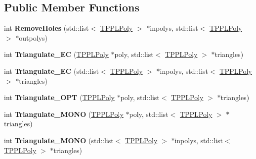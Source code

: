 \subsection*{Public Member Functions}
\begin{DoxyCompactItemize}
\item 
\mbox{\label{class_t_p_p_l_partition_ae2a167f8aa0f74725ffb389a612b0b70}} 
int {\bfseries Remove\+Holes} (std\+::list$<$ \mbox{\hyperlink{class_t_p_p_l_poly}{T\+P\+P\+L\+Poly}} $>$ $\ast$inpolys, std\+::list$<$ \mbox{\hyperlink{class_t_p_p_l_poly}{T\+P\+P\+L\+Poly}} $>$ $\ast$outpolys)
\item 
\mbox{\label{class_t_p_p_l_partition_abdd4502a0f66347ff44f4ee18d4668aa}} 
int {\bfseries Triangulate\+\_\+\+EC} (\mbox{\hyperlink{class_t_p_p_l_poly}{T\+P\+P\+L\+Poly}} $\ast$poly, std\+::list$<$ \mbox{\hyperlink{class_t_p_p_l_poly}{T\+P\+P\+L\+Poly}} $>$ $\ast$triangles)
\item 
\mbox{\label{class_t_p_p_l_partition_a5d91a5b4d233cb15b2745622a944cd04}} 
int {\bfseries Triangulate\+\_\+\+EC} (std\+::list$<$ \mbox{\hyperlink{class_t_p_p_l_poly}{T\+P\+P\+L\+Poly}} $>$ $\ast$inpolys, std\+::list$<$ \mbox{\hyperlink{class_t_p_p_l_poly}{T\+P\+P\+L\+Poly}} $>$ $\ast$triangles)
\item 
\mbox{\label{class_t_p_p_l_partition_a658327414e13faace5a882858d2ddbcb}} 
int {\bfseries Triangulate\+\_\+\+O\+PT} (\mbox{\hyperlink{class_t_p_p_l_poly}{T\+P\+P\+L\+Poly}} $\ast$poly, std\+::list$<$ \mbox{\hyperlink{class_t_p_p_l_poly}{T\+P\+P\+L\+Poly}} $>$ $\ast$triangles)
\item 
\mbox{\label{class_t_p_p_l_partition_aa0876517c10f9cb9bbb63ed570ff4071}} 
int {\bfseries Triangulate\+\_\+\+M\+O\+NO} (\mbox{\hyperlink{class_t_p_p_l_poly}{T\+P\+P\+L\+Poly}} $\ast$poly, std\+::list$<$ \mbox{\hyperlink{class_t_p_p_l_poly}{T\+P\+P\+L\+Poly}} $>$ $\ast$triangles)
\item 
\mbox{\label{class_t_p_p_l_partition_a9d9db3ab3407ad4323028a942c8c327d}} 
int {\bfseries Triangulate\+\_\+\+M\+O\+NO} (std\+::list$<$ \mbox{\hyperlink{class_t_p_p_l_poly}{T\+P\+P\+L\+Poly}} $>$ $\ast$inpolys, std\+::list$<$ \mbox{\hyperlink{class_t_p_p_l_poly}{T\+P\+P\+L\+Poly}} $>$ $\ast$triangles)

\end{DoxyCompactItemize}
